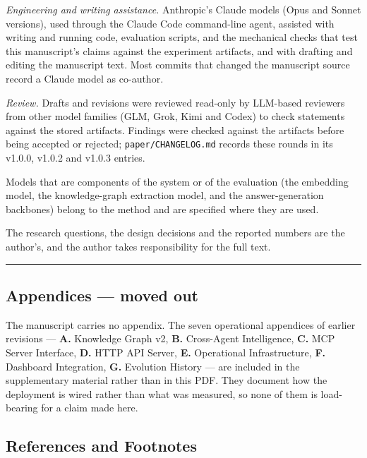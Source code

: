 \documentclass[
]{article}
\newcounter{none} %
\begin{document}
\emph{Engineering and writing assistance.} Anthropic's Claude models
(Opus and Sonnet versions), used through the Claude Code command-line
agent, assisted with writing and running code, evaluation scripts, and
the mechanical checks that test this manuscript's claims against the
experiment artifacts, and with drafting and editing the manuscript text.
Most commits that changed the manuscript source record a Claude model as
co-author.

\emph{Review.} Drafts and revisions were reviewed read-only by LLM-based
reviewers from other model families (GLM, Grok, Kimi and Codex) to check
statements against the stored artifacts. Findings were checked against
the artifacts before being accepted or rejected;
\texttt{paper/CHANGELOG.md} records these rounds in its v1.0.0, v1.0.2
and v1.0.3 entries.

Models that are components of the system or of the evaluation (the
embedding model, the knowledge-graph extraction model, and the
answer-generation backbones) belong to the method and are specified
where they are used.

The research questions, the design decisions and the reported numbers
are the author's, and the author takes responsibility for the full text.

\begin{center}\rule{0.5\linewidth}{0.5pt}\end{center}

\subsection{Appendices --- moved out}\label{appendices-moved-out}

The manuscript carries no appendix. The seven operational appendices of
earlier revisions --- \textbf{A.} Knowledge Graph v2, \textbf{B.}
Cross-Agent Intelligence, \textbf{C.} MCP Server Interface, \textbf{D.}
HTTP API Server, \textbf{E.} Operational Infrastructure, \textbf{F.}
Dashboard Integration, \textbf{G.} Evolution History --- are included in
the supplementary material rather than in this PDF. They document how
the deployment is wired rather than what was measured, so none of them
is load-bearing for a claim made here.

\subsection{References and Footnotes}\label{references-and-footnotes}
\end{document}
